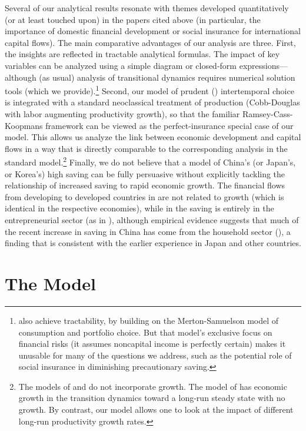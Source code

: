 \documentclass[titlepage,abstract,letterpaper]{econtex}
\begin{document}
Several of our analytical results resonate with themes developed quantitatively (or
at least touched upon) in the papers cited above (in particular, the importance of
domestic financial development or social insurance for international
capital flows). The main comparative advantages of our analysis are
three.  First, the insights are reflected in tractable analytical
formulas. The impact of key variables can be analyzed using a simple
diagram or closed-form expressions---although (as usual) analysis of
transitional dynamics requires numerical solution tools (which we
provide).\footnote{\cite{paEntrep} also achieve
  tractability, by building on the Merton-Samuelson model
  of consumption and portfolio choice.  But that model's exclusive
  focus on financial risks (it assumes noncapital income is perfectly
  certain) makes it unusable for many of the questions we address,
  such as the potential role of social insurance in diminishing
  precautionary saving.}  Second, our model of prudent (\cite{kimball:smallandlarge})
intertemporal choice is integrated with a standard neoclassical
treatment of production (Cobb-Douglas with labor augmenting
productivity growth), so that the familiar Ramsey-Cass-Koopmans
framework can be viewed as the perfect-insurance special case of our
model. This allows us analyze the link between economic development
and capital flows in a way that is directly comparable to the
corresponding analysis in the standard model.\footnote{The models of
  \cite{fogliPerriMod} and \cite{mqrImbal} do not incorporate
  growth. The model of \cite{sandriGrowth} has economic
  growth in the transition dynamics toward a long-run steady state
  with no growth. By contrast, our model allows one to look at the
  impact of different long-run productivity growth rates. }
Finally, we do not believe that a model of China's (or Japan's, or Korea's)
high saving can be fully persuasive without explicitly tackling the
relationship of increased saving to rapid economic growth.  The
financial flows from developing to developed countries in
\cite{mqrImbal} are not related to growth (which is identical in the
respective economies), while in \cite{sandriGrowth} the
saving is entirely in the entrepreneurial sector (as in
\cite{paEntrep}), although empirical evidence suggests that much of the recent increase in saving in China has come from the
household sector (\cite{syChina}), a finding that is consistent with
the earlier experience in Japan and other countries.

\section{The Model}
\end{document}
